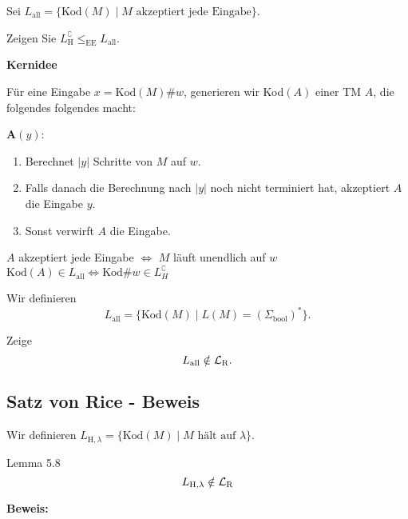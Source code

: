 
            Sei $L_{\text{all}} = \{\text{Kod}(M) \mid M \text{ akzeptiert jede Eingabe}\}$.

	Zeigen Sie $L_{\text{H}}^\complement \leq_{\text{EE}} L_{\text{all}}$.
	
	\textbf{Kernidee}

	Für eine Eingabe $x = \text{Kod}(M)\#w$, generieren wir Kod$(A)$ einer TM $A$, die folgendes folgendes macht:
	
	$\mathbf{A}(y)$:
	\begin{enumerate}[label=\arabic*.]
		
		\item Berechnet $|y|$ Schritte von $M$ auf $w$.
		\item Falls danach die Berechnung nach $|y|$ noch nicht terminiert hat, akzeptiert $A$ die Eingabe $y$.
		
		\item Sonst verwirft $A$ die Eingabe.
	\end{enumerate}
	\begin{center}
		$A$ akzeptiert jede Eingabe $\iff$ $M$ läuft unendlich auf $w$\\
		\(\text{Kod}(A) \in L_{\text{all}} \iff \text{Kod}\#w \in L_{H}^\complement\)
	\end{center}

    Wir definieren $$L_{\text{all}} = \{\text{Kod}(M) \mid L(M) = (\Sigma_{\text{bool}})^*\}.$$

    Zeige $$L_{\text{all}} \notin \mathcal{L}_\text{R}.$$
       
    
     
    \subsection{Satz von Rice - Beweis}
                
                
    
    Wir definieren $L_{\text{H}, \lambda} = \{\text{Kod}(M) \mid M \text{ hält auf }\lambda\}$.
    \begin{mainbox}{Lemma 5.8}
        $$L_{\text{H}, \lambda} \notin \mathcal{L}_\text{R}$$
    \end{mainbox}
    \textbf{Beweis: }

